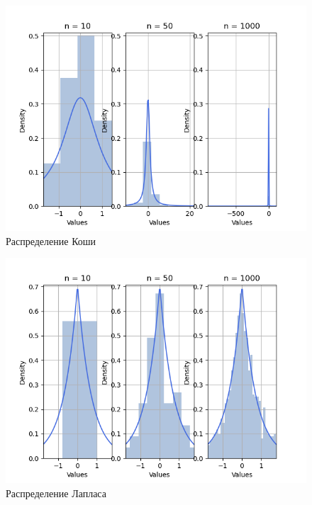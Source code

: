 \documentclass[12pt,a4paper]{article}
\begin{document}
\begin{figure}[h!]
	\centering
	\includegraphics[scale=0.8]{cauchy.png}
	\caption{Распределение Коши}
	\label{fig:image}
\end{figure}

\pagebreak

\begin{figure}[h!]
	\centering
	\includegraphics[scale=0.8]{laplace.png}
	\caption{Распределение Лапласа}
	\label{fig:image}
\end{figure}
\end{document}
